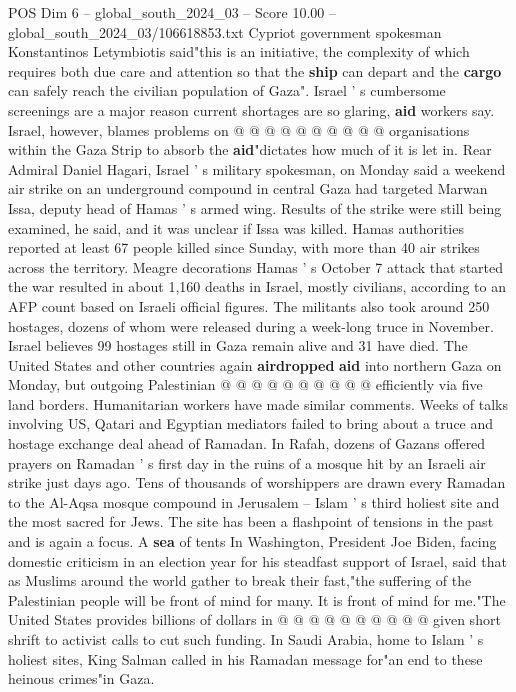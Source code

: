 \begin{textsample}{POS Dim 6 – global\_south\_2024\_03 – Score 10.00 – global\_south\_2024\_03/106618853.txt}
Cypriot government spokesman Konstantinos Letymbiotis said"this is an initiative, the complexity of which requires both due care and attention so that the \textbf{ship} can depart and the \textbf{cargo} can safely reach the civilian population of Gaza".
Israel ' s cumbersome screenings are a major reason current shortages are so glaring, \textbf{aid} workers say.
Israel, however, blames problems on @ @ @ @ @ @ @ @ @ @ organisations within the Gaza Strip to absorb the \textbf{aid}"dictates how much of it is let in.
Rear Admiral Daniel Hagari, Israel ' s military spokesman, on Monday said a weekend air strike on an underground compound in central Gaza had targeted Marwan Issa, deputy head of Hamas ' s armed wing.
Results of the strike were still being examined, he said, and it was unclear if Issa was killed.
Hamas authorities reported at least 67 people killed since Sunday, with more than 40 air strikes across the territory.
Meagre decorations Hamas ' s October 7 attack that started the war resulted in about 1,160 deaths in Israel, mostly civilians, according to an AFP count based on Israeli official figures.
The militants also took around 250 hostages, dozens of whom were released during a week-long truce in November.
Israel believes 99 hostages still in Gaza remain alive and 31 have died.
The United States and other countries again \textbf{airdropped} \textbf{aid} into northern Gaza on Monday, but outgoing Palestinian @ @ @ @ @ @ @ @ @ @ efficiently via five land borders.
Humanitarian workers have made similar comments.
Weeks of talks involving US, Qatari and Egyptian mediators failed to bring about a truce and hostage exchange deal ahead of Ramadan.
In Rafah, dozens of Gazans offered prayers on Ramadan ' s first day in the ruins of a mosque hit by an Israeli air strike just days ago.
Tens of thousands of worshippers are drawn every Ramadan to the Al-Aqsa mosque compound in Jerusalem -- Islam ' s third holiest site and the most sacred for Jews.
The site has been a flashpoint of tensions in the past and is again a focus.
A \textbf{sea} of tents In Washington, President Joe Biden, facing domestic criticism in an election year for his steadfast support of Israel, said that as Muslims around the world gather to break their fast,"the suffering of the Palestinian people will be front of mind for many.
It is front of mind for me."The United States provides billions of dollars in @ @ @ @ @ @ @ @ @ @ given short shrift to activist calls to cut such funding.
In Saudi Arabia, home to Islam ' s holiest sites, King Salman called in his Ramadan message for"an end to these heinous crimes"in Gaza.

\end{textsample}
